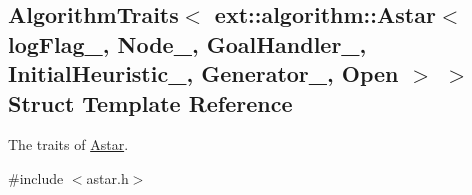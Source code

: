 \hypertarget{structAlgorithmTraits_3_01ext_1_1algorithm_1_1Astar_3_01logFlag___00_01Node___00_01GoalHandler__0d4d7766ba369ca6b5396f13cce6e730}{}\subsection{Algorithm\+Traits$<$ ext\+:\+:algorithm\+:\+:Astar$<$ log\+Flag\+\_\+, Node\+\_\+, Goal\+Handler\+\_\+, Initial\+Heuristic\+\_\+, Generator\+\_\+, Open $>$ $>$ Struct Template Reference}
\label{structAlgorithmTraits_3_01ext_1_1algorithm_1_1Astar_3_01logFlag___00_01Node___00_01GoalHandler__0d4d7766ba369ca6b5396f13cce6e730}


The traits of \hyperlink{structAstar}{Astar}.  




{\ttfamily \#include $<$astar.\+h$>$}

